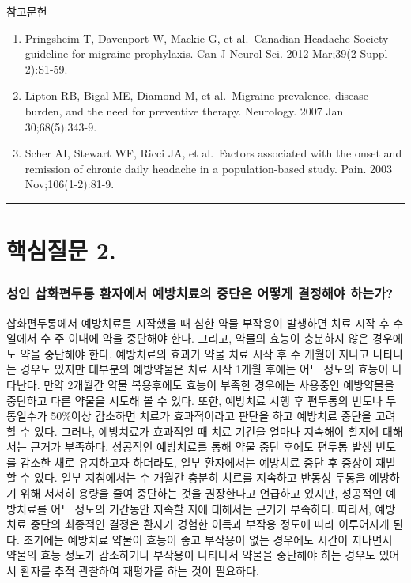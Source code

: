 \documentclass[]{book}
\begin{document}
참고문헌

\begin{enumerate}
\def\labelenumi{\arabic{enumi}.}
\item
  Pringsheim T, Davenport W, Mackie G, et al.~Canadian Headache Society guideline for migraine prophylaxis. Can J Neurol Sci. 2012 Mar;39(2 Suppl 2):S1-59.
\item
  Lipton RB, Bigal ME, Diamond M, et al.~Migraine prevalence, disease burden, and the need for preventive therapy. Neurology. 2007 Jan 30;68(5):343-9.
\item
  Scher AI, Stewart WF, Ricci JA, et al.~Factors associated with the onset and remission of chronic daily headache in a population-based study. Pain. 2003 Nov;106(1-2):81-9.
\end{enumerate}

\begin{center}\rule{0.5\linewidth}{\linethickness}\end{center}

\hypertarget{section-10}{%
\section{핵심질문 2.}\label{section-10}}

\hypertarget{section-11}{%
\subsubsection*{성인 삽화편두통 환자에서 예방치료의 중단은 어떻게 결정해야 하는가?}\label{section-11}}

삽화편두통에서 예방치료를 시작했을 때 심한 약물 부작용이 발생하면 치료 시작 후 수 일에서 수 주 이내에 약을 중단해야 한다. 그리고, 약물의 효능이 충분하지 않은 경우에도 약을 중단해야 한다. 예방치료의 효과가 약물 치료 시작 후 수 개월이 지나고 나타나는 경우도 있지만 대부분의 예방약물은 치료 시작 1개월 후에는 어느 정도의 효능이 나타난다. 만약 2개월간 약물 복용후에도 효능이 부족한 경우에는 사용중인 예방약물을 중단하고 다른 약물을 시도해 볼 수 있다. 또한, 예방치료 시행 후 편두통의 빈도나 두통일수가 50\%이상 감소하면 치료가 효과적이라고 판단을 하고 예방치료 중단을 고려할 수 있다. 그러나, 예방치료가 효과적일 때 치료 기간을 얼마나 지속해야 할지에 대해서는 근거가 부족하다. 성공적인 예방치료를 통해 약물 중단 후에도 편두통 발생 빈도를 감소한 채로 유지하고자 하더라도, 일부 환자에서는 예방치료 중단 후 증상이 재발할 수 있다. 일부 지침에서는 수 개월간 충분히 치료를 지속하고 반동성 두통을 예방하기 위해 서서히 용량을 줄여 중단하는 것을 권장한다고 언급하고 있지만, 성공적인 예방치료를 어느 정도의 기간동안 지속할 지에 대해서는 근거가 부족하다. 따라서, 예방치료 중단의 최종적인 결정은 환자가 경험한 이득과 부작용 정도에 따라 이루어지게 된다. 초기에는 예방치료 약물이 효능이 좋고 부작용이 없는 경우에도 시간이 지나면서 약물의 효능 정도가 감소하거나 부작용이 나타나서 약물을 중단해야 하는 경우도 있어서 환자를 추적 관찰하여 재평가를 하는 것이 필요하다.
\end{document}
